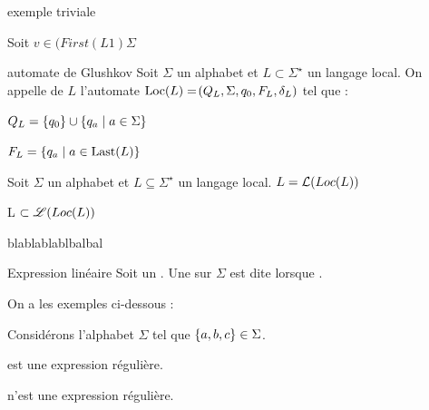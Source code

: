     \begin{example}
            exemple triviale 
            
            
            
            Soit $v \in (First(L1)\Sigma $ %
            
            
    \end{example}
    
    \begin{definition}{automate de Glushkov}{}
        Soit $\Sigma$ un alphabet et $L \subset \Sigma^\star$ un langage local. On appelle  de $L$ l'automate $\Loc{L} = \p{Q_L, \Sigma, q_0, F_L, \delta_L}$ tel que :
        \begin{enumerate}
            \itast $Q_L = \left\{q_0\right\} \cup \left\{q_a \;\middle\vert\; a \in \Sigma\right\}$
            
            \itast $F_L = \ens{q_a \enstq a \in \Last{L}} $
        \end{enumerate}
        
        
    \end{definition}
    
    \begin{theorem}
        Soit $\Sigma$ un alphabet et $L \subseteq \Sigma^\star$ un langage local. $L = \mathcal{L}(Loc(L))$
    \end{theorem}
    \begin{nproof}
        L $\subset \mathscr{L}(Loc(L))$
        \begin{enumerate}
            \itt \Huge{blablablablbalbal}
        \end{enumerate}
    \end{nproof}
    
    \begin{definition}{Expression linéaire}{}
        Soit \hg{$\Sigma$} un . Une  sur $\Sigma$ est dite  lorsque .
    \end{definition}
    
    On a les exemples ci-dessous :
    \begin{example}{}{}
        Considérons l'alphabet $\Sigma$ tel que $\left\{a, b, c\right\} \in \Sigma$.
        \begin{enumerate}
            \itt {} est une expression régulière.
            
            \itt {} n'est  une expression régulière.
        \end{enumerate}
    \end{example}
    
